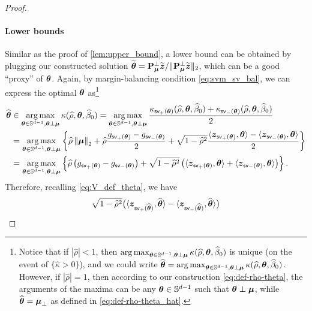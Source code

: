 \begin{proof}
\paragraph{Lower bounds} Similar as the proof of \cref{lem:upper_bound}, a lower bound can be obtained by plugging our constructed solution $\wt\vtheta = \bP_{\vmu}^\perp \wt\zz/\| \bP_{\vmu}^\perp \wt\zz \|_2$, which can be a good ``proxy'' of $\vtheta$. Again, by margin-balancing condition \cref{eq:svm_sv_bal}, we can express the optimal $\vtheta$ as\footnote{
    Notice that if $|\hat\rho| < 1$, then $\argmax_{ \vtheta \in \S^{d-1}, \vtheta \perp \vmu } \kappa(\hat\rho, \vtheta, \hat\beta_0)$ is unique (on the event of $\{ \hat\kappa > 0\}$), and we could write $\hat\vtheta = \argmax_{ \vtheta \in \S^{d-1}, \vtheta \perp \vmu } \kappa(\hat\rho, \vtheta, \hat\beta_0)$. However, if $|\hat\rho| = 1$, then according to our construction \cref{eq:def-rho-theta}, the arguments of the maxima can be any $\vtheta \in \S^{d-1}$ such that $\vtheta \perp \vmu$, while $\hat\vtheta = \vmu_\perp$ as defined in \cref{eq:def-rho-theta_hat}.
}
\begin{equation*}
    \begin{aligned}
        \hat\vtheta & \in \argmax_{ \vtheta \in \S^{d-1}, \vtheta \perp \vmu } \kappa(\hat\rho, \vtheta, \hat\beta_0)
    = \argmax_{ \vtheta \in \S^{d-1}, \vtheta \perp \vmu } \frac{\kappa_{\mathsf{sv}_+(\vtheta)}(\hat\rho, \vtheta, \hat\beta_0) + \kappa_{\mathsf{sv}_-(\vtheta)}(\hat\rho, \vtheta, \hat\beta_0)}{2} \\
    & = \argmax_{ \vtheta \in \S^{d-1}, \vtheta \perp \vmu } 
    \left\{ \hat\rho \norm{\vmu}_2 + \hat\rho \frac{g_{\mathsf{sv}_+(\vtheta)} - g_{\mathsf{sv}_-(\vtheta)} }{2} + \sqrt{1 - \hat\rho^2}  \frac{ \< \zz_{\mathsf{sv}_+(\vtheta)}, \vtheta \>  -  \< \zz_{\mathsf{sv}_-(\vtheta)}, \vtheta \>  }{2} \right\}   \\
    & = \argmax_{ \vtheta \in \S^{d-1}, \vtheta \perp \vmu } \left\{  \hat\rho \left(  g_{\mathsf{sv}_+(\vtheta)} - g_{\mathsf{sv}_-(\vtheta)} \right) +  \sqrt{1 - \hat\rho^2} \left( \< \zz_{\mathsf{sv}_+(\vtheta)}, \vtheta \>  +  \< \zz_{\mathsf{sv}_-(\vtheta)}, \vtheta \> \right)  \right\}.
    \end{aligned}
\end{equation*}
Therefore, recalling \cref{eq:V_def_theta}, we have
\begin{align*}
        & \sqrt{1 - \hat\rho^2}  \bigl( \< \zz_{\mathsf{sv}_+(\hat\vtheta)}, \hat\vtheta \>  -  \< \zz_{\mathsf{sv}_-(\hat\vtheta)}, \hat\vtheta \>  \bigr) \\

\end{align*}
\end{proof}

